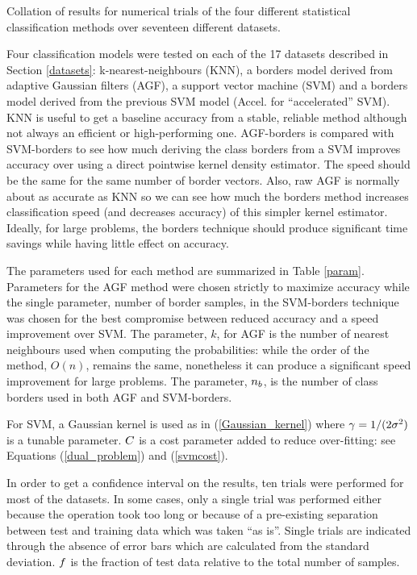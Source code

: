 \begin{table}
	\caption{Collation of results for numerical trials of the four different statistical classification methods over seventeen different datasets.}
	\label{results2}
	{\small
		
	}
\end{table}

Four classification models were tested on each of the 17 datasets described in
Section \ref{datasets}: k-nearest-neighbours (KNN), a borders model derived from
adaptive Gaussian filters (AGF), a support vector machine (SVM) and a borders
model derived from the previous SVM model (Accel. for ``accelerated'' SVM).
KNN is useful to get a baseline accuracy from a stable, reliable method although
not always an efficient or high-performing one.
AGF-borders is compared with SVM-borders to see how much deriving the class borders
from a SVM improves accuracy over using a direct pointwise kernel density estimator.
The speed should be the same for the same number of border vectors.
Also, raw AGF is normally about as accurate as KNN so we can see how much the 
borders method increases classification speed (and decreases accuracy) of this simpler kernel estimator.
Ideally, for large problems, the borders technique should produce significant time
savings while having little effect on accuracy.

The parameters used for each method are summarized in Table \ref{param}.
Parameters for the AGF method were chosen strictly to maximize accuracy while
the single parameter, number of border samples, in the SVM-borders technique
was chosen for the best compromise between reduced accuracy and a speed
improvement over SVM. The parameter, $k$, for AGF is the number of nearest
neighbours used when computing the probabilities: 
while the order of the method, $O(n)$, remains the same, nonetheless it can produce a significant speed improvement for large problems.
The parameter, $n_b$, is the number of class borders used in both 
AGF and SVM-borders.

For SVM, a Gaussian kernel is used as in (\ref{Gaussian_kernel})
where $\gamma=1/(2 \sigma^2)$ is a tunable parameter. 
$C$ is a cost parameter added to reduce over-fitting: see
Equations (\ref{dual_problem}) and (\ref{svmcost}).

In order to get a confidence interval on the results,
ten trials were performed for most of the datasets.
In some cases, only a single trial was performed either because the operation
took too long or because of a pre-existing separation between test and training
data which was taken ``as is''. Single trials are indicated through the absence of
error bars which are calculated from the standard deviation.
$f$ is the fraction of test data relative to the total number
of samples.

